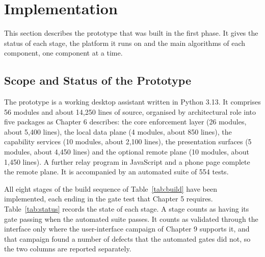 \documentclass{FastFyp}
\begin{document}
\section{Implementation}
This section describes the prototype that was built in the first phase. It gives the status of each stage, the platform it runs on and the main algorithms of each component, one component at a time.

\subsection{Scope and Status of the Prototype}
The prototype is a working desktop assistant written in Python 3.13. It comprises 56 modules and about 14,250 lines of source, organised by architectural role into five packages as Chapter 6 describes: the core enforcement layer (26 modules, about 5,400 lines), the local data plane (4 modules, about 850 lines), the capability services (10 modules, about 2,100 lines), the presentation surfaces (5 modules, about 4,450 lines) and the optional remote plane (10 modules, about 1,450 lines). A further relay program in JavaScript and a phone page complete the remote plane. It is accompanied by an automated suite of 554 tests.

All eight stages of the build sequence of Table~\ref{tab:build} have been implemented, each ending in the gate test that Chapter 5 requires. Table~\ref{tab:status} records the state of each stage. A stage counts as having its gate passing when the automated suite passes. It counts as validated through the interface only where the user-interface campaign of Chapter 9 supports it, and that campaign found a number of defects that the automated gates did not, so the two columns are reported separately.
\end{document}
